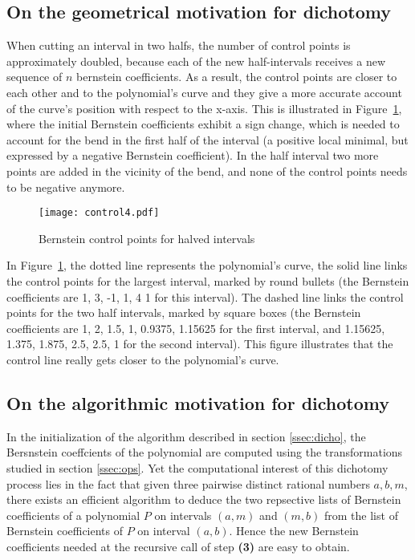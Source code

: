 \documentclass{mscs}
\begin{document}
\subsection{On the geometrical motivation for dichotomy}\label{ssec:dichogeom}
When cutting an interval in two halfs, the number of control points is
approximately doubled, because each of the new half-intervals receives a
new sequence of \(n\) bernstein coefficients.  As a result, the control points
are closer to each other and to the polynomial's curve and they give a more
accurate account of the curve's position with respect to the x-axis.  This is
illustrated in Figure~\ref{dichotomy-curve}, where the initial Bernstein
coefficients exhibit a sign change, which is needed to account for the bend
in the first half of the interval (a positive local minimal, but expressed
by a negative Bernstein coefficient).  In the half interval two more points
are added in the vicinity of the bend, and none of the control points needs
to be negative anymore.
\begin{figure}
\texttt{[image: control4.pdf]}
\caption{\label{dichotomy-curve}Bernstein control points for halved intervals}
\end{figure}

In Figure~\ref{dichotomy-curve}, the dotted line represents
the polynomial's curve, the solid line links the control points for
the largest interval, marked by round bullets (the Bernstein coefficients are
1, 3, -1, 1, 4 1 for this interval).  The dashed line links the control points
for the two half intervals, marked by square boxes
(the Bernstein coefficients are 1, 2, 1.5, 1,
0.9375, 1.15625 for the first interval, and 1.15625, 1.375, 1.875, 2.5, 2.5,
1 for the second interval).  This figure illustrates that the control line
really gets closer to the polynomial's curve.

\subsection{On the algorithmic motivation for dichotomy}

In the initialization of the algorithm described in section
\ref{ssec:dicho}, the Bersnstein coeffcients of the polynomial are
computed using the transformations studied in section \ref{ssec:ops}.
Yet the computational interest of this dichotomy process lies in the
fact that given three pairwise distinct rational numbers $a, b, m$,
there exists an efficient algorithm to deduce the two repsective lists
of Bernstein coefficients of a polynomial $P$ on intervals $(a, m)$
and $(m, b)$ from the list of Bernstein coefficients of $P$ on
interval $(a, b)$. Hence the new Bernstein coefficients needed at the
recursive call of step {\bf (3)} are easy to obtain.
\end{document}
